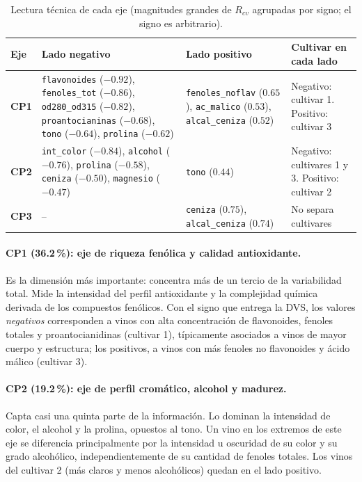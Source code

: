 \documentclass[11pt,a4paper]{article}
\newcommand{\var}[1]{\texttt{#1}}
\begin{document}
\begin{table}[H]
\centering\small
\caption{Lectura técnica de cada eje (magnitudes grandes de $R_{cv}$ agrupadas por signo; el signo es arbitrario).}
\begin{tabularx}{\textwidth}{>{\bfseries}l >{\raggedright\arraybackslash}X >{\raggedright\arraybackslash}X >{\raggedright\arraybackslash}p{3.2cm}}
\toprule
Eje & Lado negativo & Lado positivo & Cultivar en cada lado \\
\midrule
CP1 & \var{flavonoides} ($-0.92$), \var{fenoles\_tot} ($-0.86$), \var{od280\_od315} ($-0.82$), \var{proantocianinas} ($-0.68$), \var{tono} ($-0.64$), \var{prolina} ($-0.62$)
    & \var{fenoles\_noflav} ($0.65$), \var{ac\_malico} ($0.53$), \var{alcal\_ceniza} ($0.52$)
    & Negativo: cultivar 1. Positivo: cultivar 3 \\
CP2 & \var{int\_color} ($-0.84$), \var{alcohol} ($-0.76$), \var{prolina} ($-0.58$), \var{ceniza} ($-0.50$), \var{magnesio} ($-0.47$)
    & \var{tono} ($0.44$)
    & Negativo: cultivares 1 y 3. Positivo: cultivar 2 \\
CP3 & -- & \var{ceniza} ($0.75$), \var{alcal\_ceniza} ($0.74$) & No separa cultivares \\
\bottomrule
\end{tabularx}
\end{table}

\paragraph{CP1 (36.2\,\%): eje de riqueza fenólica y calidad antioxidante.} Es la dimensión más importante: concentra más de un tercio de la variabilidad total. Mide la intensidad del perfil antioxidante y la complejidad química derivada de los compuestos fenólicos. Con el signo que entrega la DVS, los valores \emph{negativos} corresponden a vinos con alta concentración de flavonoides, fenoles totales y proantocianidinas (cultivar 1), típicamente asociados a vinos de mayor cuerpo y estructura; los positivos, a vinos con más fenoles no flavonoides y ácido málico (cultivar 3).

\paragraph{CP2 (19.2\,\%): eje de perfil cromático, alcohol y madurez.} Capta casi una quinta parte de la información. Lo dominan la intensidad de color, el alcohol y la prolina, opuestos al tono. Un vino en los extremos de este eje se diferencia principalmente por la intensidad u oscuridad de su color y su grado alcohólico, independientemente de su cantidad de fenoles totales. Los vinos del cultivar 2 (más claros y menos alcohólicos) quedan en el lado positivo.
\end{document}
